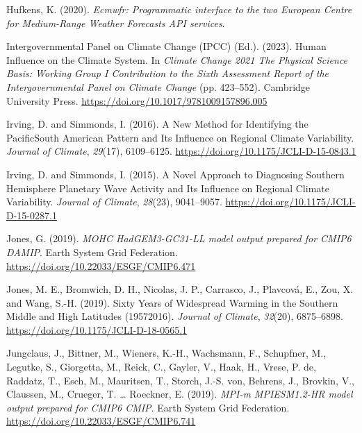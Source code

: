\documentclass[12pt,oneside,a4paper]{reedthesis}
\newlength{\cslhangindent}
\newenvironment{CSLReferences}[2] %
 {%
  \setlength{\parindent}{0pt}
  \ifodd #1 \everypar{\setlength{\hangindent}{\cslhangindent}}\ignorespaces\fi
  \ifnum #2 > 0
  \setlength{\parskip}{#2\baselineskip}
  \fi
 }%
 {}
\begin{document}
\begin{CSLReferences}{1}{0}
\leavevmode{}%
Hufkens, K. (2020). \emph{Ecmwfr: {Programmatic} interface to the two {European Centre} for {Medium-Range Weather Forecasts API} services}.

\leavevmode{}%
Intergovernmental Panel on Climate Change (IPCC) (Ed.). (2023). Human {Influence} on the {Climate System}. In \emph{Climate {Change} 2021 {\textendash} {The Physical Science Basis}: {Working Group I Contribution} to the {Sixth Assessment Report} of the {Intergovernmental Panel} on {Climate Change}} (pp. 423--552). {Cambridge University Press}. \url{https://doi.org/10.1017/9781009157896.005}

\leavevmode{}%
Irving, D. and Simmonds, I. (2016). A {New Method} for {Identifying} the {Pacific}{\textendash}{South American Pattern} and {Its Influence} on {Regional Climate Variability}. \emph{Journal of Climate}, \emph{29}(17), 6109--6125. \url{https://doi.org/10.1175/JCLI-D-15-0843.1}

\leavevmode{}%
Irving, D. and Simmonds, I. (2015). A {Novel Approach} to {Diagnosing Southern Hemisphere Planetary Wave Activity} and {Its Influence} on {Regional Climate Variability}. \emph{Journal of Climate}, \emph{28}(23), 9041--9057. \url{https://doi.org/10.1175/JCLI-D-15-0287.1}

\leavevmode{}%
Jones, G. (2019). \emph{MOHC HadGEM3-GC31-LL model output prepared for CMIP6 DAMIP}. Earth System Grid Federation. \url{https://doi.org/10.22033/ESGF/CMIP6.471}

\leavevmode{}%
Jones, M. E., Bromwich, D. H., Nicolas, J. P., Carrasco, J., Plavcová, E., Zou, X. and Wang, S.-H. (2019). Sixty {Years} of {Widespread Warming} in the {Southern Middle} and {High Latitudes} (1957{\textendash}2016). \emph{Journal of Climate}, \emph{32}(20), 6875--6898. \url{https://doi.org/10.1175/JCLI-D-18-0565.1}

\leavevmode{}%
Jungclaus, J., Bittner, M., Wieners, K.-H., Wachsmann, F., Schupfner, M., Legutke, S., Giorgetta, M., Reick, C., Gayler, V., Haak, H., Vrese, P. de, Raddatz, T., Esch, M., Mauritsen, T., Storch, J.-S. von, Behrens, J., Brovkin, V., Claussen, M., Crueger, T. \ldots{} Roeckner, E. (2019). \emph{MPI-m MPIESM1.2-HR model output prepared for CMIP6 CMIP}. Earth System Grid Federation. \url{https://doi.org/10.22033/ESGF/CMIP6.741}


\end{CSLReferences}
\end{document}
